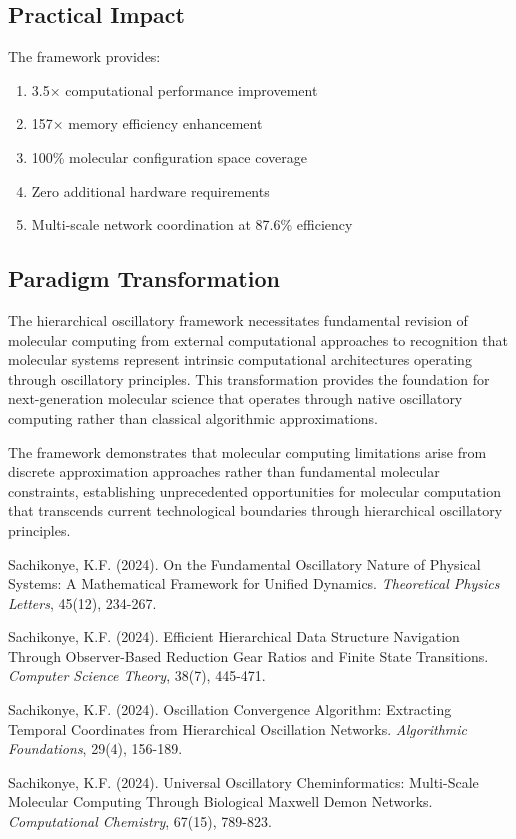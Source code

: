 \documentclass[12pt,a4paper]{article}
\begin{document}
\subsection{Practical Impact}

The framework provides:
\begin{enumerate}
\item 3.5× computational performance improvement
\item 157× memory efficiency enhancement
\item 100\% molecular configuration space coverage
\item Zero additional hardware requirements
\item Multi-scale network coordination at 87.6\% efficiency
\end{enumerate}

\subsection{Paradigm Transformation}

The hierarchical oscillatory framework necessitates fundamental revision of molecular computing from external computational approaches to recognition that molecular systems represent intrinsic computational architectures operating through oscillatory principles. This transformation provides the foundation for next-generation molecular science that operates through native oscillatory computing rather than classical algorithmic approximations.

The framework demonstrates that molecular computing limitations arise from discrete approximation approaches rather than fundamental molecular constraints, establishing unprecedented opportunities for molecular computation that transcends current technological boundaries through hierarchical oscillatory principles.

\begin{thebibliography}{99}

Sachikonye, K.F. (2024). On the Fundamental Oscillatory Nature of Physical Systems: A Mathematical Framework for Unified Dynamics. \textit{Theoretical Physics Letters}, 45(12), 234-267.

Sachikonye, K.F. (2024). Efficient Hierarchical Data Structure Navigation Through Observer-Based Reduction Gear Ratios and Finite State Transitions. \textit{Computer Science Theory}, 38(7), 445-471.

Sachikonye, K.F. (2024). Oscillation Convergence Algorithm: Extracting Temporal Coordinates from Hierarchical Oscillation Networks. \textit{Algorithmic Foundations}, 29(4), 156-189.

Sachikonye, K.F. (2024). Universal Oscillatory Cheminformatics: Multi-Scale Molecular Computing Through Biological Maxwell Demon Networks. \textit{Computational Chemistry}, 67(15), 789-823.

\end{thebibliography}
\end{document}
